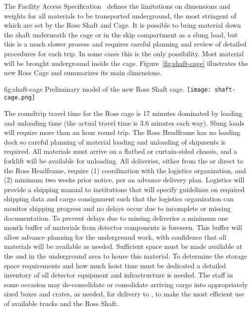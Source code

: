 The  Facility Access Specification~\cite{bib:docdb328} defines the limitations on dimensions and weights for all materials to be transported underground, the most stringent of which are set by the Ross Shaft and Cage.
It is possible to bring material down the shaft underneath the cage or in the skip compartment as a slung load, but this is a much slower process and requires careful planning and review of detailed procedures for each trip.
In some cases this is the only possibility.
Most material will be brought underground inside the cage.
Figure~\ref{fig:shaft-cage} illustrates the new Ross Cage and summarizes its main dimensions.
\begin{dunefigure}{fig:shaft-cage}
{Preliminary model of the new Ross Shaft cage.}
\texttt{[image: shaft-cage.png]}
\end{dunefigure}

The roundtrip travel time for the Ross cage is 17 minutes dominated by loading and unloading time (the actual travel time is 3.6 minutes each way).
Slung loads will require more than an hour round trip.
The Ross Headframe has no loading dock so careful planning of material loading and unloading of shipments is required.
All materials must arrive on a flatbed or curtain-sided chassis, and a
forklift will be available for unloading.
All deliveries, either from the  or direct to the Ross Headframe, require (1) coordination with the  logistics organization, and (2) minimum two weeks prior notice, per an advance delivery plan.
Logistics will provide a shipping manual to  institutions that will specify guidelines on required shipping data and cargo consignment such that the logistics organization can monitor shipping progress and no delays occur due to incomplete or missing documentation.
To prevent delays due to missing deliveries a minimum one month buffer of materials from detector components is foreseen.
This buffer will allow advance planning for the underground work, with confidence that all materials will be available as needed.
Sufficient space must be made available at the  and in the underground area to house this material.
To determine the storage space requirements and how much hoist time must be dedicated a detailed inventory of all detector equipment and infrastructure is needed.
The  staff in some occasion may de-consolidate or consolidate arriving cargo into appropriately sized boxes and crates, as needed, for delivery to , to make the most efficient use of available trucks and the Ross Shaft.

